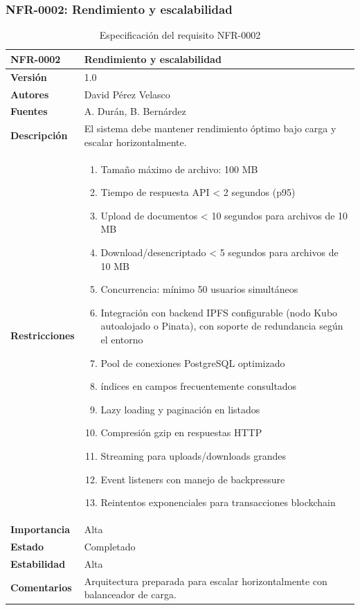 \documentclass[11pt, a4paper]{article}
\begin{document}
\subsubsection{NFR-0002: Rendimiento y escalabilidad}

\begin{table}[H]
    \centering
    \small
    \begin{tabular}{|p{4cm}|p{10cm}|}
    \hline
    \textbf{NFR-0002} & Rendimiento y escalabilidad \\
    \hline
    \textbf{Versión} & 1.0 \\
    \hline
    \textbf{Autores} & David Pérez Velasco \\
    \hline
    \textbf{Fuentes} & A. Durán, B. Bernárdez \\
    \hline
    \textbf{Descripción} & El sistema debe mantener rendimiento óptimo bajo carga y escalar horizontalmente. \\
    \hline
    \textbf{Restricciones} & 
    \begin{enumerate}
        \item Tamaño máximo de archivo: 100 MB
        \item Tiempo de respuesta API < 2 segundos (p95)
        \item Upload de documentos < 10 segundos para archivos de 10 MB
        \item Download/desencriptado < 5 segundos para archivos de 10 MB
        \item Concurrencia: mínimo 50 usuarios simultáneos
        \item Integración con backend IPFS configurable (nodo Kubo autoalojado o Pinata), con soporte de redundancia según el entorno
        \item Pool de conexiones PostgreSQL optimizado
        \item índices en campos frecuentemente consultados
        \item Lazy loading y paginación en listados
        \item Compresión gzip en respuestas HTTP
        \item Streaming para uploads/downloads grandes
        \item Event listeners con manejo de backpressure
        \item Reintentos exponenciales para transacciones blockchain
    \end{enumerate} \\
    \hline
    \textbf{Importancia} & Alta \\
    \hline
    \textbf{Estado} & Completado \\
    \hline
    \textbf{Estabilidad} & Alta \\
    \hline
    \textbf{Comentarios} & Arquitectura preparada para escalar horizontalmente con balanceador de carga. \\
    \hline
    \end{tabular}
    \caption{Especificación del requisito NFR-0002}
\end{table}
\end{document}
